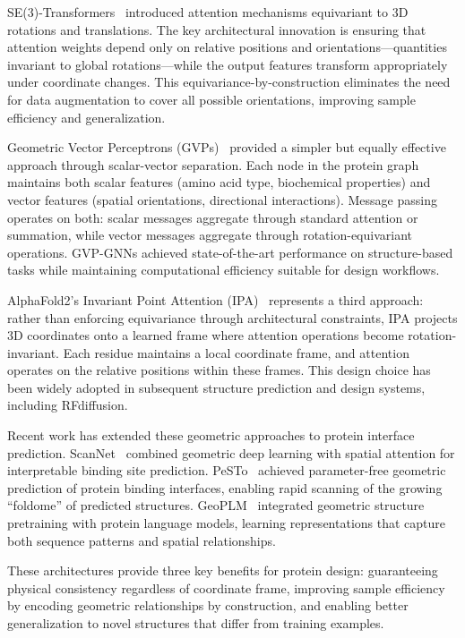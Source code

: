 SE(3)-Transformers~\citep{fuchs2020se3transformer} introduced attention mechanisms equivariant to 3D rotations and translations. The key architectural innovation is ensuring that attention weights depend only on relative positions and orientations---quantities invariant to global rotations---while the output features transform appropriately under coordinate changes. This equivariance-by-construction eliminates the need for data augmentation to cover all possible orientations, improving sample efficiency and generalization.

Geometric Vector Perceptrons (GVPs)~\citep{jing2021gvp} provided a simpler but equally effective approach through scalar-vector separation. Each node in the protein graph maintains both scalar features (amino acid type, biochemical properties) and vector features (spatial orientations, directional interactions). Message passing operates on both: scalar messages aggregate through standard attention or summation, while vector messages aggregate through rotation-equivariant operations. GVP-GNNs achieved state-of-the-art performance on structure-based tasks while maintaining computational efficiency suitable for design workflows.

AlphaFold2's Invariant Point Attention (IPA)~\citep{jumper2021alphafold} represents a third approach: rather than enforcing equivariance through architectural constraints, IPA projects 3D coordinates onto a learned frame where attention operations become rotation-invariant. Each residue maintains a local coordinate frame, and attention operates on the relative positions within these frames. This design choice has been widely adopted in subsequent structure prediction and design systems, including RFdiffusion.

Recent work has extended these geometric approaches to protein interface prediction. ScanNet~\citep{tubiana2022scannet} combined geometric deep learning with spatial attention for interpretable binding site prediction. PeSTo~\citep{krapp2023pesto} achieved parameter-free geometric prediction of protein binding interfaces, enabling rapid scanning of the growing ``foldome'' of predicted structures. GeoPLM~\citep{zhang2023geoplm} integrated geometric structure pretraining with protein language models, learning representations that capture both sequence patterns and spatial relationships.

These architectures provide three key benefits for protein design: guaranteeing physical consistency regardless of coordinate frame, improving sample efficiency by encoding geometric relationships by construction, and enabling better generalization to novel structures that differ from training examples.

